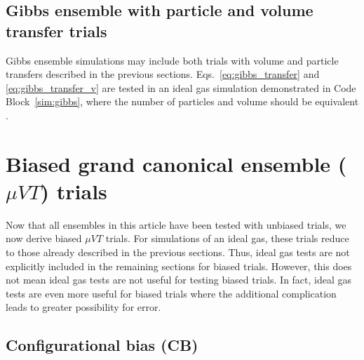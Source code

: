 \documentclass[
  9pt,
  bestpractices,
]{livecoms}
\begin{document}
\subsection{\label{sec:lhs_gibbs}Gibbs ensemble with particle and volume transfer trials}

Gibbs ensemble simulations may include both trials with volume and particle transfers described in the previous sections.
Eqs.~\ref{eq:gibbs_transfer} and \ref{eq:gibbs_transfer_v} are tested in an ideal gas simulation demonstrated in Code Block~\ref{sim:gibbs}, where the number of particles and volume should be equivalent \cite{hatch_theory_2024}.

\begin{figure}

\end{figure}

\section{\label{sec:lhs_gcmc_bias}Biased grand canonical ensemble ($\mu VT$) trials}

Now that all ensembles in this article have been tested with unbiased trials, we now derive biased $\mu VT$ trials.
For simulations of an ideal gas, these trials reduce to those already described in the previous sections.
Thus, ideal gas tests are not explicitly included in the remaining sections for biased trials.
However, this does not mean ideal gas tests are not useful for testing biased trials.
In fact, ideal gas tests are even more useful for biased trials where the additional complication leads to greater possibility for error.

\subsection{\label{sec:lhs_insdel_cb}Configurational bias (CB)}
\end{document}

